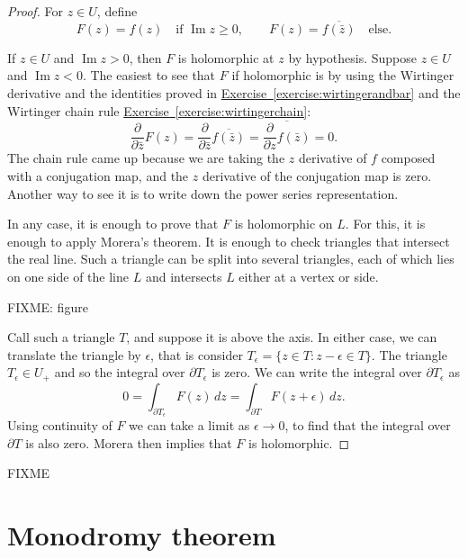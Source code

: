 \documentclass[12pt,openany]{book}
\renewcommand{\Im}{\operatorname{Im}}
\theoremstyle{plain}
\theoremstyle{remark}
\theoremstyle{definition}
\theoremstyle{exercise}
\theoremstyle{example}
\newcommand{\exerciseref}[1]{\hyperref[#1]{Exercise~\ref*{#1}}}
\begin{document}
\begin{proof}
For $z \in U$, define
\begin{equation*}
F(z) =
f(z) \quad \text{if } \Im z \geq 0,
\qquad
F(z) =
\overline{f(\bar{z})} \quad \text{else} .
\end{equation*}

If $z \in U$ and $\Im z > 0$, then $F$ is holomorphic at $z$ by hypothesis.
Suppose $z \in U$ and $\Im z < 0$.  The easiest to see that $F$
if holomorphic is by using the Wirtinger derivative and the
identities proved in \exerciseref{exercise:wirtingerandbar} and
the Wirtinger chain rule \exerciseref{exercise:wirtingerchain}:
\begin{equation*}
\frac{\partial}{\partial \bar{z}}
F(z)
=
\frac{\partial}{\partial \bar{z}}
\overline{f(\bar{z})}
=
\overline{
\frac{\partial}{\partial z}
f(\bar{z})
}
=
0 .
\end{equation*}
The chain rule came up because we are taking the $z$ derivative of $f$
composed with a conjugation map, and the $z$ derivative of the conjugation
map is zero.
Another way to see it is to write down the power series representation.

In any case, it is enough to prove that $F$ is holomorphic on $L$.
For this, it is enough to apply Morera's theorem.  It is enough to check
triangles that intersect the real line.  Such a triangle can be split into
several triangles, each of which lies on one side of the line $L$ and
intersects $L$ either at a vertex or side. 

FIXME: figure

Call such a triangle $T$, and suppose it is above the axis.
In either case, we can translate the triangle by $\epsilon$, that is
consider $T_\epsilon = \{ z \in T : z-\epsilon \in T \}$.
The triangle $T_\epsilon \in U_+$ and so
the integral over $\partial T_\epsilon$
is zero.  We can write the integral over $\partial T_\epsilon$
as
\begin{equation*}
0 = \int_{\partial T_\epsilon} F(z) \, dz =
\int_{\partial T} F(z+\epsilon) \, dz .
\end{equation*}
Using continuity of $F$ we can
take a limit as $\epsilon \to 0$, to find that the integral over $\partial T$
is also zero.  Morera then implies that $F$ is holomorphic.
\end{proof}

FIXME


\section{Monodromy theorem}
\end{document}
